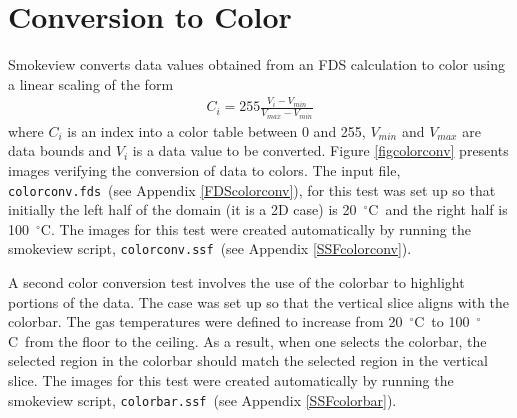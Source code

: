 \documentclass[11pt,twoside]{book}
\newcommand{\degC}{$^\circ$C}
\begin{document}
\section{Conversion to Color}
Smokeview converts data values obtained from an FDS calculation
to color using a linear scaling of the form
\begin{eqnarray*}
C_i=255\frac{V_i-V_{min}}{V_{max}-V_{min}}
\end{eqnarray*}
where $C_i$ is an index into a color table between 0 and 255, $V_{min}$ and $V_{max}$  are data bounds
and $V_i$ is a data value to be converted.
Figure \ref{figcolorconv} presents images verifying the conversion of data to colors.
The input file, {\tt colorconv.fds}\ (see Appendix \ref{FDScolorconv}), for this test was set up so that
initially the left half of the domain (it is a 2D case) is 20~\degC\ and the right half is 100~\degC.
The images for this test were created automatically by running the smokeview script, {\tt colorconv.ssf}\ (see Appendix \ref{SSFcolorconv}).

A second color conversion test involves the use of the colorbar to highlight portions of the data.  The case was set up so that the vertical slice aligns with the colorbar.  The gas temperatures were defined to increase from 20~\degC\ to 100~\degC\ from the floor to the ceiling.  As a result, when one selects the colorbar, the selected region in the colorbar should match the selected region in the vertical slice.
The images for this test were created automatically by running the smokeview script, {\tt colorbar.ssf}\ (see Appendix \ref{SSFcolorbar}).
\end{document}
